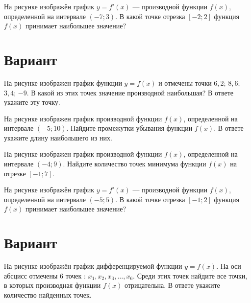 \begin{taskBN}{4}
На рисунке изображён график $y=f'(x)$ — производной функции $f(x)$, определенной на интервале $(-7;3)$. В какой точке отрезка $[-2; 2]$ функция $f(x)$ принимает наибольшее значение?
\end{taskBN}

\newpage\section{Вариант}\begin{taskBN}{1}
На рисунке изображен график функции $y=f(x)$ и отмечены точки $6,2$; $8,6$; $3,4$; $-9$. В какой из этих точек значение производной наибольшая? В ответе укажите эту точку. 
\end{taskBN}

\begin{taskBN}{2}
На рисунке изображен график производной функции $f(x)$, определенной на интервале $(-5;10)$. Найдите промежутки убывания функции $f(x)$. В ответе укажите длину наибольшего из них.
\end{taskBN}

\begin{taskBN}{3}
На рисунке изображен график производной функции $f(x)$, определенной на интервале $(-4;9)$. Найдите количество точек минимума функции $f(x)$ на отрезке $[-1;7]$. 
\end{taskBN}

\begin{taskBN}{4}
На рисунке изображён график $y=f'(x)$ — производной функции $f(x)$, определенной на интервале $(-5;5)$. В какой точке отрезка $[-1; 2]$ функция $f(x)$ принимает наибольшее значение?
\end{taskBN}

\newpage\section{Вариант}\begin{taskBN}{1}
На рисунке изображён график дифференцируемой функции $y=f(x)$. На оси абсцисс отмечены 6 точек : $x_1, x_2, x_3, \dots, x_6$. Среди этих точек найдите все точки, в которых производная функции $f(x)$ отрицательна. В ответе укажите количество найденных точек.
\end{taskBN}

